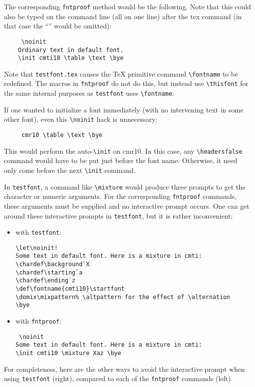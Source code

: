\documentclass[draft]{article}
\newcommand\file[1]{\texttt{#1}}
\renewcommand\"{\verb"}
\begin{document}
{The corresponding \file{fntproof} method would be the following. Note 
that this could also be typed on the command line (all on one line) 
after the tex command (in that case the ``\""'' would be omitted):
\begin{verbatim}
     \noinit
    Ordinary text in default font.
    \init cmti10 \table \text \bye
\end{verbatim}
Note that \file{testfont.tex} causes the \TeX{} primitive command
\"\fontname" to be redefined. The macros in \file{fntproof} do not do 
this, but instead use \"\thisfont" for the same internal purposes as 
\file{testfont} uses \"\fontname".

If one wanted to initialize a font immediately (with no intervening
text in some other font), even this \"\noinit" hack is unnecessary:
\begin{verbatim}
     cmr10 \table \text \bye
\end{verbatim}
This would perform the auto-\"\init" on cmr10. In this case, any
\"\headersfalse" command would have to be put just before the font name.
Otherwise, it need only come before the next \"\init" command.

In \file{testfont}, a command like \"\mixture" would produce three
prompts to get the character or numeric arguments. For the corresponding
\file{fntproof} commands, these arguments must be supplied and no
interactive prompt occurs. One can get around these interactive prompts
in \file{testfont}, but it is rather inconvenient:

\begin{itemize}
\item with \file{testfont}:
\begin{verbatim}
\let\noinit! 
Some text in default font. Here is a mixture in cmti:
\chardef\background`X
\chardef\starting`a
\chardef\ending`z
\def\fontname{cmti10}\startfont
\domix\mixpattern% \altpattern for the effect of \alternation
\bye
\end{verbatim}

\item with \file{fntproof}:
\begin{verbatim}
 \noinit
Some text in default font. Here is a mixture in cmti:
\init cmti10 \mixture Xaz \bye
\end{verbatim}
\end{itemize}

For completeness, here are the other ways to avoid the interactive
prompt when using \file{testfont} (right), compared to each of the
\file{fntproof} commands (left).

}
\end{document}
